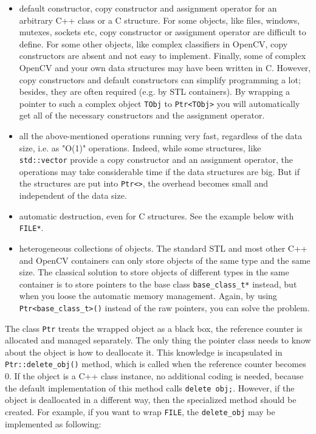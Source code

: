 \begin{itemize}
    \item default constructor, copy constructor and assignment operator for an arbitrary C++ class or a C structure. For some objects, like files, windows, mutexes, sockets etc, copy constructor or assignment operator are difficult to define. For some other objects, like complex classifiers in OpenCV, copy constructors are absent and not easy to implement. Finally, some of complex OpenCV and your own data structures may have been written in C. However, copy constructors and default constructors can simplify programming a lot; besides, they are often required (e.g. by STL containers). By wrapping a pointer to such a complex object \texttt{TObj} to \texttt{Ptr<TObj>} you will automatically get all of the necessary constructors and the assignment operator.
    \item all the above-mentioned operations running very fast, regardless of the data size, i.e. as "O(1)" operations. Indeed, while some structures, like \texttt{std::vector} provide a copy constructor and an assignment operator, the operations may take considerable time if the data structures are big. But if the structures are put into \texttt{Ptr<>}, the overhead becomes small and independent of the data size.
    \item automatic destruction, even for C structures. See the example below with \texttt{FILE*}.  
    \item heterogeneous collections of objects. The standard STL and most other C++ and OpenCV containers can only store objects of the same type and the same size. The classical solution to store objects of different types in the same container is to store pointers to the base class \texttt{base\_class\_t*} instead, but when you loose the automatic memory management. Again, by using \texttt{Ptr<base\_class\_t>()} instead of the raw pointers, you can solve the problem.
\end{itemize}    

The class \texttt{Ptr} treats the wrapped object as a black box, the reference counter is allocated and managed separately. The only thing the pointer class needs to know about the object is how to deallocate it. This knowledge is incapsulated in \texttt{Ptr::delete\_obj()} method, which is called when the reference counter becomes 0. If the object is a C++ class instance, no additional coding is needed, because the default implementation of this method calls \texttt{delete obj;}.
However, if the object is deallocated in a different way, then the specialized method should be created. For example, if you want to wrap \texttt{FILE}, the \texttt{delete\_obj} may be implemented as following:

